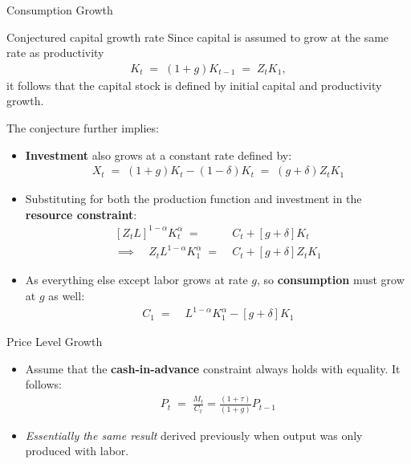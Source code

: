 \documentclass[10pt,c,aspectratio=1610,handout]{beamer}
\begin{document}
\begin{frame}{Consumption Growth}%
  \begin{small}%
    \begin{block}{\small Conjectured capital growth rate}%
      Since capital is assumed to grow at the same rate as productivity%
      \begin{align*}%
        K_{t} \; = \; (1+g) K_{t-1} \; = \; Z_{t} K_{1},%
      \end{align*}%
      it follows that the capital stock is defined by initial capital and productivity growth.%
    \end{block}%
  \end{small}%
  \pause%
  The conjecture further implies:%
  \begin{itemize}%
    \item[$\blacktriangleright$] \textbf{Investment} also grows at a constant rate defined by:%
    \begin{align*}%
      X_{t} \; = \; (1+g) K_{t} - (1-\delta) K_{t} \; = \; (g + \delta) Z_{t} K_{1}%
    \end{align*}%
    \vspace*{-0.2in}%
    \pause%
    \item[$\blacktriangleright$] Substituting for both the production function and investment in the \textbf{resource constraint}:%
    \begin{align*}%
      \left[ Z_{t} L \right]^{1-\alpha} K_{t}^{\alpha} \; = & \; C_{t} + \left[ g+\delta \right] K_{t} \\%
      \implies \quad Z_{t} L^{1-\alpha} K_{1}^{\alpha} \; = & \; C_{t} + \left[ g+\delta \right] Z_{t} K_{1}%
    \end{align*}%
    \vspace*{-0.2in}%
    \pause%
    \item[$\blacktriangleright$] As everything else except labor grows at rate $g$, so \textbf{consumption} must grow at $g$ as well:%
    \begin{align*}%
      C_1 \; = & \; L^{1-\alpha} K_{1}^{\alpha} - \left[ g+\delta \right] K_{1}%
    \end{align*}%
  \end{itemize}%
\end{frame}%
\begin{frame}{Price Level Growth}%
  \begin{itemize}%
    \item[$\blacktriangleright$] Assume that the \textbf{cash-in-advance} constraint always holds with equality. It follows:%
    \begin{align*}%
      P_{t} \; = \; \frac{M_{t}}{C_{t}}=\frac{(1+\tau )}{(1+g)}P_{t-1}%
    \end{align*}%
    \item[$\blacktriangleright$] \emph{Essentially the same result} derived previously when output was only produced with labor.%
  \end{itemize}%
\end{frame}%
\end{document}
